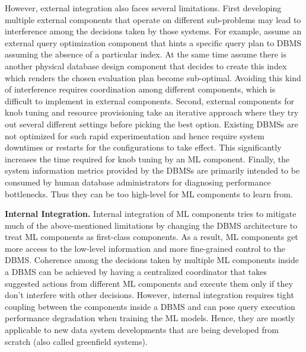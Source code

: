 However, external integration also faces several limitations.
First developing multiple external components that operate on different sub-problems may lead to interference among the decisions taken by those systems.
For example, assume an external query optimization component that hints a specific query plan to DBMS assuming the absence of a particular index.
At the same time assume there is another physical database design component that decides to create this index which renders the chosen evaluation plan become sub-optimal.
Avoiding this kind of interference requires coordination among different components, which is difficult to implement in external components.
Second, external components for knob tuning and resource provisioning take an iterative approach where they try out several different settings before picking the best option.
Existing DBMSs are not optimized for such rapid experimentation and hence require system downtimes or restarts for the configurations to take effect.
This significantly increases the time required for knob tuning by an ML component.
Finally, the system information metrics provided by the DBMSs are primarily intended to be consumed by human database administrators for diagnosing performance bottlenecks.
Thus they can be too high-level for ML components to learn from.

\vspace{2mm}
\noindent \textbf{Internal Integration.} 
Internal integration of ML components tries to mitigate much of the above-mentioned limitations by changing the DBMS architecture to treat ML components as first-class components.
As a result, ML components get more access to the low-level information and more fine-grained control to the DBMS.
Coherence among the decisions taken by multiple ML components inside a DBMS can be achieved by having a centralized coordinator that takes suggested actions from different ML components and execute them only if they don't interfere with other decisions.
However, internal integration requires tight coupling between the components inside a DBMS and can pose query execution performance degradation when training the ML models.
Hence, they are mostly applicable to new data system developments that are being developed from scratch (also called greenfield systems).

